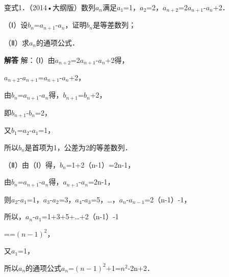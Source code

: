 变式1．（2014•大纲版）数列{\ensuremath{a_{n}}}满足\ensuremath{a_{1}}=1，\ensuremath{a_{2}}=2，\ensuremath{a_{n+2}}=2\ensuremath{a_{n+1}}-\ensuremath{a_{n}}+2．\par
（Ⅰ）设\ensuremath{b_{n}}=\ensuremath{a_{n+1}}-\ensuremath{a_{n}}，证明{\ensuremath{b_{n}}}是等差数列；\par
（Ⅱ）求{\ensuremath{a_{n}}}的通项公式．\par
\ifshowanswers
\par\begingroup\color{solutioncolor}\noindent\textbf{解答}\quad
解：（Ⅰ）由\ensuremath{a_{n+2}}=2\ensuremath{a_{n+1}}-\ensuremath{a_{n}}+2得，\par
\ensuremath{a_{n+2}}-\ensuremath{a_{n+1}}=\ensuremath{a_{n+1}}-\ensuremath{a_{n}}+2，\par
由\ensuremath{b_{n}}=\ensuremath{a_{n+1}}-\ensuremath{a_{n}}得，\ensuremath{b_{n+1}}=\ensuremath{b_{n}}+2，\par
即\ensuremath{b_{n+1}}-\ensuremath{b_{n}}=2，\par
又\ensuremath{b_{1}}=\ensuremath{a_{2}}-\ensuremath{a_{1}}=1，\par
所以{\ensuremath{b_{n}}}是首项为1，公差为2的等差数列．\par
（Ⅱ）由（Ⅰ）得，\ensuremath{b_{n}}=1+2（n-1）=2n-1，\par
由\ensuremath{b_{n}}=\ensuremath{a_{n+1}}-\ensuremath{a_{n}}得，\ensuremath{a_{n+1}}-\ensuremath{a_{n}}=2n-1，\par
则\ensuremath{a_{2}}-\ensuremath{a_{1}}=1，\ensuremath{a_{3}}-\ensuremath{a_{2}}=3，\ensuremath{a_{4}}-\ensuremath{a_{3}}=5，\ldots{}，\ensuremath{a_{n}}-\ensuremath{a_{n-1}}=2（n-1）-1，\par
所以，\ensuremath{a_{n}}-\ensuremath{a_{1}}=1+3+5+\ldots{}+2（n-1）-1\par
==\ensuremath{(n-1)^{2}}，\par
又\ensuremath{a_{1}}=1，\par
所以{\ensuremath{a_{n}}}的通项公式\ensuremath{a_{n}}=\ensuremath{(n-1)^{2}}+1=\ensuremath{n^{2}}-2n+2．\par
\par\endgroup\fi

\par\medskip{}\par

